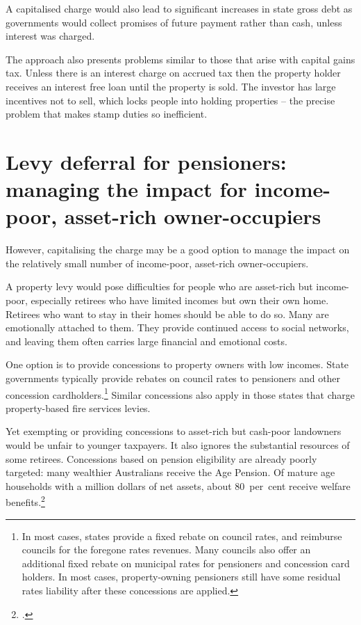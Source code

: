\documentclass[twoside,english]{palatinob5ona4portrait}
\begin{document}
A capitalised charge would also lead to significant increases in state gross debt as governments would collect promises of future payment rather than cash, unless interest was charged. 

The approach also presents problems similar to those that arise with capital gains tax. Unless there is an interest charge on accrued tax then the property holder receives an interest free loan until the property is sold. The investor has large incentives not to sell, which locks people into holding properties – the precise problem that makes stamp duties so inefficient. 


\section{Levy deferral for pensioners: managing the impact for income-poor, asset-rich owner-occupiers\label{sec:PROP-6-5}}
However, capitalising the charge may be a good option to manage the impact on the relatively small number of income-poor, asset-rich owner-occupiers.

A property levy would pose difficulties for people who are asset-rich but income-poor, especially retirees who have limited incomes but own their own home. Retirees who want to stay in their homes should be able to do so. Many are emotionally attached to them. They provide continued access to social networks, and leaving them often carries large financial and emotional costs. 

One option is to provide concessions to property owners with low incomes. State governments typically provide rebates on council rates to pensioners and other concession cardholders.\footnote{In most cases, states provide a fixed rebate on council rates, and reimburse councils for the foregone rates revenues. Many councils also offer an additional fixed rebate on municipal rates for pensioners and concession card holders. In most cases, property-owning pensioners still have some residual rates liability after these concessions are applied.}  Similar concessions also apply in those states that charge property-based fire services levies. 

Yet exempting or providing concessions to asset-rich but cash-poor landowners would be unfair to younger taxpayers. It also ignores the substantial resources of some retirees. Concessions based on pension eligibility are already poorly targeted: many wealthier Australians receive the Age Pension. Of mature age households with a million dollars of net assets, about 80~per~cent receive welfare benefits.\footcite[][37]{DaleyMcGannonSavageEtAl2013BalancingBudgets}  
\end{document}
